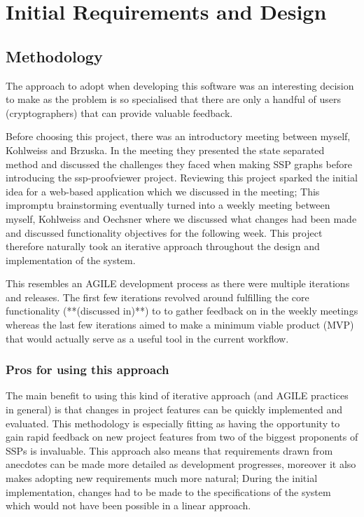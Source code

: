 \documentclass[bsc,frontabs,singlespacing,parskip,deptreport]{infthesis}
\begin{document}
\chapter{Initial Requirements and Design}

\section{Methodology}
The approach to adopt when developing this software was an interesting decision to make as the problem is so specialised that there are only a handful of users (cryptographers) that can provide valuable feedback. 

Before choosing this project, there was an introductory meeting between myself, Kohlweiss and Brzuska. In the meeting they presented the state separated method and discussed the challenges they faced when making SSP graphs before introducing the ssp-proofviewer project. Reviewing this project sparked the initial idea for a web-based application which we discussed in the meeting; This impromptu brainstorming eventually turned into a weekly meeting between myself, Kohlweiss and Oechsner where we discussed what changes had been made and discussed functionality objectives for the following week. This project therefore naturally took an iterative approach throughout the design and implementation of the system. 

This resembles an AGILE development process\cite{shore2021art} as there were multiple iterations and releases. The first few iterations revolved around fulfilling the core functionality (**(discussed in)**) to to gather feedback on in the weekly meetings whereas the last few iterations aimed to make a minimum viable product (MVP) that would actually serve as a useful tool in the current workflow. 

\subsection{Pros for using this approach}

The main benefit to using this kind of iterative approach (and AGILE practices in general) is that changes in project features can be quickly implemented and evaluated. This methodology is especially fitting as having the opportunity to gain rapid feedback on new project features from two of the biggest proponents of SSPs is invaluable. This approach also means that requirements drawn from anecdotes can be made more detailed as development progresses, moreover it also makes adopting new requirements much more natural; During the initial implementation, changes had to be made to the specifications of the system which would not have been possible in a linear approach.
\end{document}
